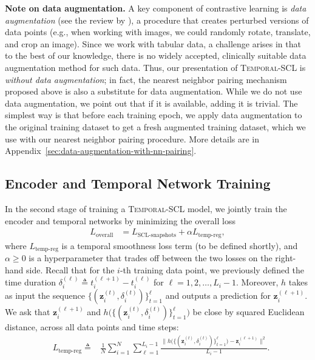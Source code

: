 \documentclass[pmlr,twocolumn,10pt]{jmlr} %
\begin{document}
\vspace{.2em}
\noindent
\textbf{Note on data augmentation.}
A key component of contrastive learning is \emph{data augmentation} (see the review by \citet{le2020contrastive}), a procedure that creates perturbed versions of data points (e.g., when working with images, we could randomly rotate, translate, and crop an image). Since we work with tabular data, a challenge arises in that to the best of our knowledge, there is no widely accepted, clinically suitable data augmentation method for such data. Thus, our presentation of \textsc{Temporal-SCL} is \emph{without data augmentation}; in fact, the nearest neighbor pairing mechanism proposed above is also a substitute for data augmentation. %
While we do not use data augmentation, we point out that if it is available, adding it is trivial. The simplest way is that before each training epoch, we apply data augmentation to the original training dataset to get a fresh augmented training dataset, which we use with our nearest neighbor pairing procedure. More details are in Appendix~\ref{sec:data-augmentation-with-nn-pairing}.


\vspace{-1em}
\subsection{Encoder and Temporal Network Training}
\label{sec:joint-optimization}
\vspace{-.5em}
 
\label{sec:transform}

In the second stage of training a \textsc{Temporal-SCL} model, we jointly train the encoder and temporal networks by minimizing the overall loss
\begin{align}
    L_{\text{overall}} &=L_{\text{SCL-snapshots}}+ \alpha L_{\text{temp-reg}},
\label{eq:mainLoss}
\end{align}
where $L_{\text{temp-reg}}$ is a temporal smoothness loss term (to be defined shortly), and ${\alpha\ge0}$ is a hyperparameter that trades off between the two losses on the right-hand side.
Recall that for the \mbox{$i$-th} training data point, we previously defined the time duration $\delta_i^{(\ell)}\triangleq t_i^{(\ell+1)} - t_i^{(\ell)}$ for $\ell=1,2,\dots,{L_i-1}$. 
Moreover, $h$ takes as input the sequence $\{(\mathbf{z}_i^{(t)},\delta_i^{(t)})\}_{t=1}^{\ell}$ and outputs a prediction for $\mathbf{z}_i^{(\ell+1)}$. 
We ask that $\mathbf{z}_i^{(\ell+1)}$ and $h\big(\{(\mathbf{z}_i^{(t)},\delta_i^{(t)})\}_{t=1}^{\ell}\big)$ be close by squared Euclidean distance, across all data points and time steps:
\begin{align*}
&L_{\text{temp-reg}}
\!\triangleq \!\!\!\!\!
&\!\frac{1}{N}\!\sum_{i=1}^N  \! \sum_{\ell=1}^{L_i - 1} \! \frac{
\big\| h\big(\{(\mathbf{z}_i^{(t)},\delta_i^{(t)})\}_{t=1}^{\ell}\big)
\!-\! \mathbf{z}_i^{(\ell+1)} \big\|^2 }{L_i-1}.
\end{align*}
\end{document}
